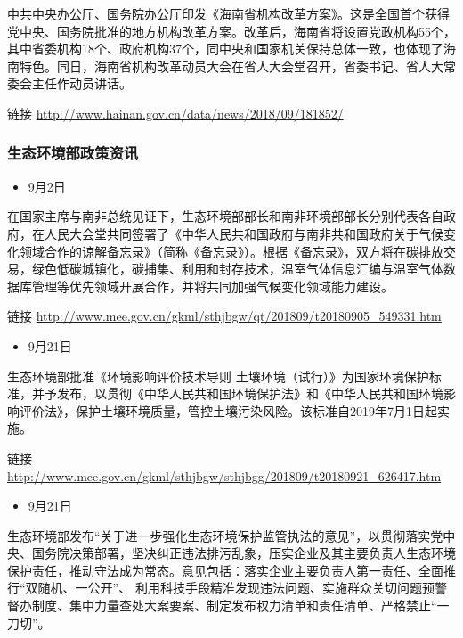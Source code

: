 \documentclass[
]{book}
\providecommand{\tightlist}{%
  \setlength{\itemsep}{0pt}\setlength{\parskip}{0pt}}
\begin{document}
中共中央办公厅、国务院办公厅印发《海南省机构改革方案》。这是全国首个获得党中央、国务院批准的地方机构改革方案。改革后，海南省将设置党政机构55个，其中省委机构18个、政府机构37个，同中央和国家机关保持总体一致，也体现了海南特色。同日，海南省机构改革动员大会在省人大会堂召开，省委书记、省人大常委会主任作动员讲话。

链接 \url{http://www.hainan.gov.cn/data/news/2018/09/181852/}

\hypertarget{ux751fux6001ux73afux5883ux90e8ux653fux7b56ux8d44ux8baf-5}{%
\subsubsection*{生态环境部政策资讯}\label{ux751fux6001ux73afux5883ux90e8ux653fux7b56ux8d44ux8baf-5}}

\begin{itemize}
\tightlist
\item
  9月2日
\end{itemize}

在国家主席与南非总统见证下，生态环境部部长和南非环境部部长分别代表各自政府，在人民大会堂共同签署了《中华人民共和国政府与南非共和国政府关于气候变化领域合作的谅解备忘录》（简称《备忘录》）。根据《备忘录》，双方将在碳排放交易，绿色低碳城镇化，碳捕集、利用和封存技术，温室气体信息汇编与温室气体数据库管理等优先领域开展合作，并将共同加强气候变化领域能力建设。

链接 \url{http://www.mee.gov.cn/gkml/sthjbgw/qt/201809/t20180905_549331.htm}

\begin{itemize}
\tightlist
\item
  9月21日
\end{itemize}

生态环境部批准《环境影响评价技术导则 土壤环境（试行）》为国家环境保护标准，并予发布，以贯彻《中华人民共和国环境保护法》和《中华人民共和国环境影响评价法》，保护土壤环境质量，管控土壤污染风险。该标准自2019年7月1日起实施。

链接 \url{http://www.mee.gov.cn/gkml/sthjbgw/sthjbgg/201809/t20180921_626417.htm}

\begin{itemize}
\tightlist
\item
  9月21日
\end{itemize}

生态环境部发布``关于进一步强化生态环境保护监管执法的意见''，以贯彻落实党中央、国务院决策部署，坚决纠正违法排污乱象，压实企业及其主要负责人生态环境保护责任，推动守法成为常态。意见包括：落实企业主要负责人第一责任、全面推行``双随机、一公开''、 利用科技手段精准发现违法问题、实施群众关切问题预警督办制度、集中力量查处大案要案、制定发布权力清单和责任清单、严格禁止``一刀切''。
\end{document}
